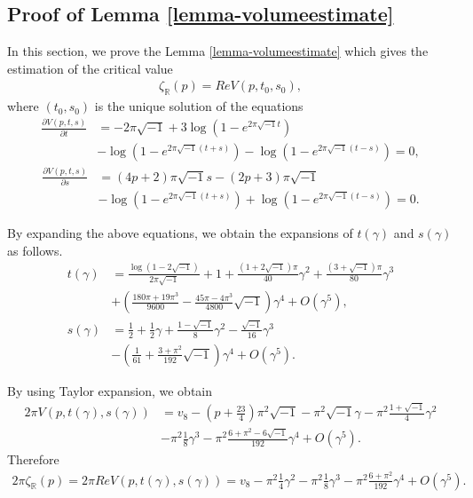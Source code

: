 \documentclass[12pt]{amsart}
\begin{document}
\subsection{Proof of Lemma \ref{lemma-volumeestimate}}  \label{appendix-2}
In this section, we prove the Lemma \ref{lemma-volumeestimate} which gives the estimation of the critical value 
\begin{align}
        \zeta_{\mathbb{R}}(p)=Re V(p,t_0,s_0), 
\end{align}
where $(t_0,s_0)$ is the unique solution of the equations
\begin{align}  
    \frac{\partial V(p,t,s)}{\partial t}&=-2\pi\sqrt{-1}+3\log(1-e^{2\pi\sqrt{-1}t})\\\nonumber
    &-\log(1-e^{2\pi\sqrt{-1}(t+s)})-\log(1-e^{2\pi\sqrt{-1}(t-s)})=0,
\end{align}
\begin{align} 
    \frac{\partial V(p,t,s)}{\partial s}&=(4p+2)\pi\sqrt{-1}s-(2p+3)\pi\sqrt{-1}\\\nonumber
    &-\log(1-e^{2\pi\sqrt{-1}(t+s)})+\log(1-e^{2\pi\sqrt{-1}(t-s)})=0. 
\end{align}


By expanding the above equations, we obtain the expansions of $t(\gamma)$ and $s(\gamma)$ as follows.
\begin{align}
    t(\gamma)&=\frac{\log(1-2\sqrt{-1})}{2\pi\sqrt{-1}}+1+\frac{(1+2\sqrt{-1})\pi}{40}\gamma^2+\frac{(3+\sqrt{-1})\pi}{80}\gamma^3\\\nonumber
    &+(\frac{180\pi+19\pi^3}{9600}-\frac{45\pi-4\pi^3}{4800}\sqrt{-1})\gamma^4+O(\gamma^5),\\\nonumber
    s(\gamma)&=\frac{1}{2}+\frac{1}{2}\gamma+\frac{1-\sqrt{-1}}{8}\gamma^2-\frac{\sqrt{-1}}{16}\gamma^3\\\nonumber
    &-(\frac{1}{61}+\frac{3+\pi^2}{192}\sqrt{-1})\gamma^4+O(\gamma^5). 
\end{align}


By using Taylor expansion, we obtain 
\begin{align}
 2\pi V(p,t(\gamma),s(\gamma))&=v_8-(p+\frac{23}{4})\pi^2\sqrt{-1}-\pi^2 \sqrt{-1}\gamma-\pi^2\frac{1+\sqrt{-1}}{4}\gamma^2\\\nonumber
 &-\pi^2\frac{1}{8}\gamma^3-\pi^2\frac{6+\pi^2-6\sqrt{-1}}{192}\gamma^4+O(\gamma^5).   
\end{align}
Therefore
\begin{align}
    2\pi \zeta_{\mathbb{R}}(p)=2\pi Re V(p,t(\gamma),s(\gamma))=v_8-\pi^2\frac{1}{4}\gamma^2-\pi^2\frac{1}{8}\gamma^3-\pi^2 \frac{6+\pi^2}{192}\gamma^4+O(\gamma^5).
\end{align}
\end{document}
